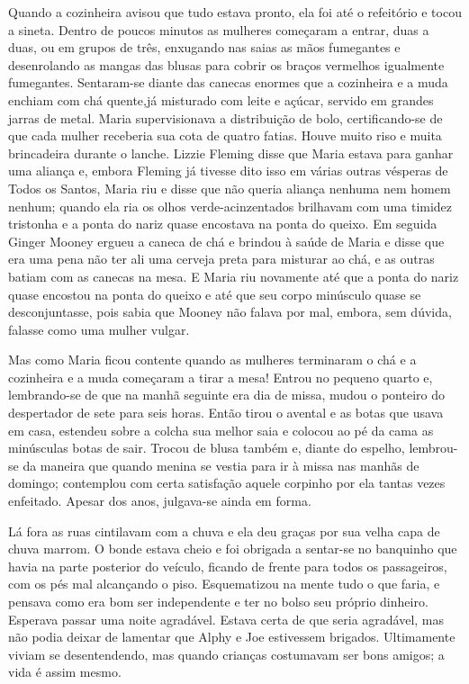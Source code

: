 Quando a cozinheira avisou que tudo estava pronto, ela foi até o
refeitório e tocou a sineta. Dentro de poucos minutos as mulheres
começaram a entrar, duas a duas, ou em grupos de três, enxugando nas
saias as mãos fumegantes e desenrolando as mangas das blusas para
cobrir os braços vermelhos igualmente fumegantes. Sentaram-se diante
das canecas enormes que a cozinheira e a muda enchiam com chá
quente,já misturado com leite e açúcar, servido em grandes jarras de
metal. Maria supervisionava a distribuição de bolo, certificando-se
de que cada mulher receberia sua cota de quatro fatias. Houve muito
riso e muita brincadeira
durante o lanche. Lizzie Fleming disse que Maria estava para ganhar
uma aliança e, embora Fleming já tivesse dito isso em várias outras
vésperas de Todos os Santos, Maria riu e disse que não queria aliança
nenhuma nem homem nenhum; quando ela ria os olhos verde-acinzentados
brilhavam com uma timidez tristonha e a ponta do nariz quase
encostava na ponta do queixo. Em seguida Ginger Mooney ergueu a caneca
de chá e brindou à saúde de Maria e disse que era uma pena não ter ali
uma cerveja preta para misturar ao chá, e as outras batiam com as
canecas na mesa. E Maria riu novamente até que a ponta do nariz quase
encostou na ponta do queixo e até que seu corpo minúsculo quase se
desconjuntasse, pois sabia que Mooney não falava por mal, embora,
sem dúvida, falasse como uma mulher vulgar.

Mas como Maria ficou contente quando as mulheres terminaram o chá e
a cozinheira e a muda começaram a tirar a mesa! Entrou no pequeno
quarto e, lembrando-se de que na manhã seguinte era dia de missa,
mudou o ponteiro do despertador de sete para seis horas. Então tirou o
avental e as botas que usava em casa, estendeu sobre a colcha sua
melhor saia e colocou ao pé da cama as minúsculas botas de sair.
Trocou de blusa também e, diante do espelho, lembrou-se da maneira que
quando menina se vestia para ir à missa nas manhãs de domingo;
contemplou com certa satisfação aquele corpinho por ela tantas vezes
enfeitado. Apesar dos anos, julgava-se ainda em forma.

Lá fora as ruas cintilavam com a chuva e ela deu graças por sua velha
capa de chuva marrom. O bonde estava cheio e foi obrigada a sentar-se
no banquinho que havia na parte posterior do veículo, ficando de
frente para todos os passageiros, com os pés mal alcançando o piso.
Esquematizou na mente tudo o que faria, e pensava como era bom ser
independente e ter no bolso seu próprio dinheiro. Esperava passar uma
noite agradável. Estava certa de que seria agradável, mas não podia
deixar de lamentar que Alphy e Joe estivessem brigados. Ultimamente
viviam se desentendendo, mas quando crianças costumavam ser bons
amigos; a vida é assim mesmo.

